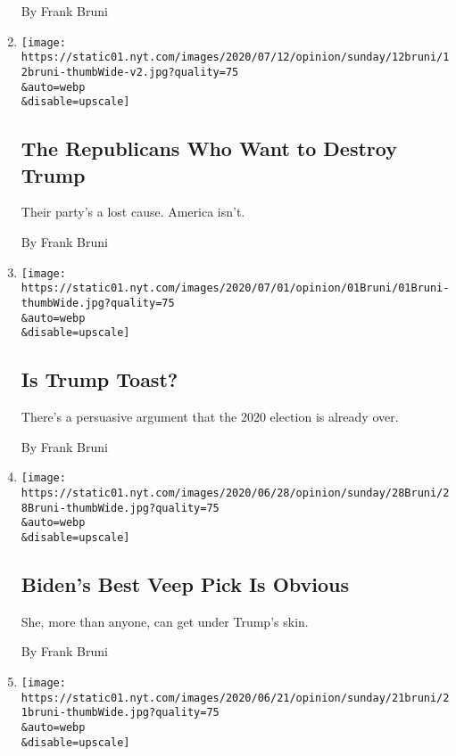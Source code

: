 \begin{enumerate}
  By Frank Bruni
\item
  \href{/2020/07/11/opinion/sunday/republican-party-trump-2020.html}{}

  \texttt{[image: https://static01.nyt.com/images/2020/07/12/opinion/sunday/12bruni/12bruni-thumbWide-v2.jpg?quality=75\\\&auto=webp\\\&disable=upscale]}

  \hypertarget{the-republicans-who-want-to-destroy-trump}{%
  \subsection{The Republicans Who Want to Destroy
  Trump}\label{the-republicans-who-want-to-destroy-trump}}

  Their party's a lost cause. America isn't.

  By Frank Bruni
\item
  \href{/2020/07/01/opinion/trump-lose-2020-election.html}{}

  \texttt{[image: https://static01.nyt.com/images/2020/07/01/opinion/01Bruni/01Bruni-thumbWide.jpg?quality=75\\\&auto=webp\\\&disable=upscale]}

  \hypertarget{is-trump-toast}{%
  \subsection{Is Trump Toast?}\label{is-trump-toast}}

  There's a persuasive argument that the 2020 election is already over.

  By Frank Bruni
\item
  \href{/2020/06/27/opinion/sunday/tammy-duckworth-biden-2020.html}{}

  \texttt{[image: https://static01.nyt.com/images/2020/06/28/opinion/sunday/28Bruni/28Bruni-thumbWide.jpg?quality=75\\\&auto=webp\\\&disable=upscale]}

  \hypertarget{bidens-best-veep-pick-is-obvious}{%
  \subsection{Biden's Best Veep Pick Is
  Obvious}\label{bidens-best-veep-pick-is-obvious}}

  She, more than anyone, can get under Trump's skin.

  By Frank Bruni
\item
  \href{/2020/06/20/opinion/sunday/trump-supreme-court.html}{}

  \texttt{[image: https://static01.nyt.com/images/2020/06/21/opinion/sunday/21bruni/21bruni-thumbWide.jpg?quality=75\\\&auto=webp\\\&disable=upscale]}


\end{enumerate}
